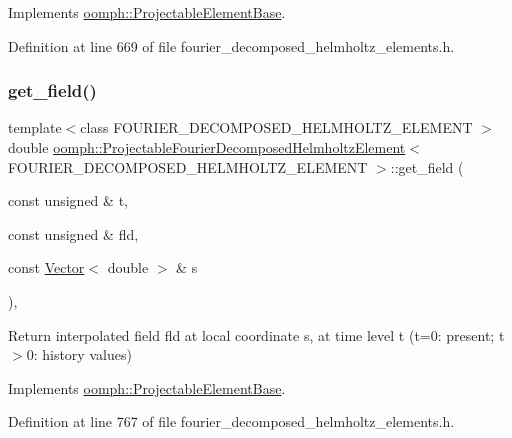 Implements \hyperlink{classoomph_1_1ProjectableElementBase_a644306ebdf16f334344c2d27d72f18b7}{oomph\+::\+Projectable\+Element\+Base}.



Definition at line 669 of file fourier\+\_\+decomposed\+\_\+helmholtz\+\_\+elements.\+h.

\mbox{\label{classoomph_1_1ProjectableFourierDecomposedHelmholtzElement_a163cc475f2675b5cc5e596ae9326df1b}} 
\subsubsection{\texorpdfstring{get\+\_\+field()}{get\_field()}}
{\footnotesize\ttfamily template$<$class F\+O\+U\+R\+I\+E\+R\+\_\+\+D\+E\+C\+O\+M\+P\+O\+S\+E\+D\+\_\+\+H\+E\+L\+M\+H\+O\+L\+T\+Z\+\_\+\+E\+L\+E\+M\+E\+NT $>$ \\
double \hyperlink{classoomph_1_1ProjectableFourierDecomposedHelmholtzElement}{oomph\+::\+Projectable\+Fourier\+Decomposed\+Helmholtz\+Element}$<$ F\+O\+U\+R\+I\+E\+R\+\_\+\+D\+E\+C\+O\+M\+P\+O\+S\+E\+D\+\_\+\+H\+E\+L\+M\+H\+O\+L\+T\+Z\+\_\+\+E\+L\+E\+M\+E\+NT $>$\+::get\+\_\+field (\begin{DoxyParamCaption}\item[{const unsigned \&}]{t,  }\item[{const unsigned \&}]{fld,  }\item[{const \hyperlink{classoomph_1_1Vector}{Vector}$<$ double $>$ \&}]{s }\end{DoxyParamCaption})\hspace{0.3cm}{\ttfamily [inline]}, {\ttfamily [virtual]}}



Return interpolated field fld at local coordinate s, at time level t (t=0\+: present; t$>$0\+: history values) 



Implements \hyperlink{classoomph_1_1ProjectableElementBase_ae4da5b565b6d333be2f5920f7be763cd}{oomph\+::\+Projectable\+Element\+Base}.



Definition at line 767 of file fourier\+\_\+decomposed\+\_\+helmholtz\+\_\+elements.\+h.



